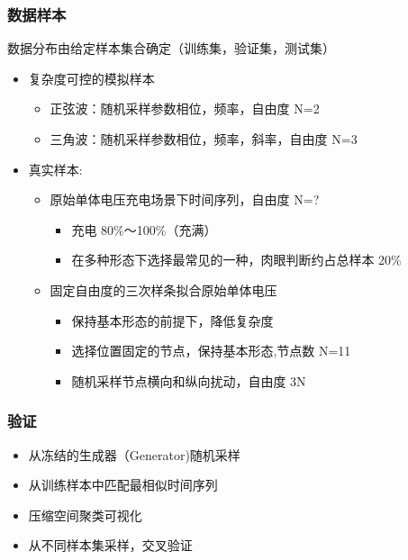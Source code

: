 \documentclass[a4paper, 11pt]{article}
\begin{document}
\subsubsection*{数据样本}
\label{sec:org7ee37eb}
数据分布由给定样本集合确定（训练集，验证集，测试集）
\begin{itemize}
\item 复杂度可控的模拟样本
\begin{itemize}
\item 正弦波：随机采样参数相位，频率，自由度 N=2
\item 三角波：随机采样参数相位，频率，斜率，自由度 N=3
\end{itemize}
\item 真实样本:
\begin{itemize}
\item 原始单体电压充电场景下时间序列，自由度 N=?
\begin{itemize}
\item 充电 80\%～100\%（充满）
\item 在多种形态下选择最常见的一种，肉眼判断约占总样本 20\%
\end{itemize}
\item 固定自由度的三次样条拟合原始单体电压
\begin{itemize}
\item 保持基本形态的前提下，降低复杂度
\item 选择位置固定的节点，保持基本形态,节点数 N=11
\item 随机采样节点横向和纵向扰动，自由度 3N
\end{itemize}
\end{itemize}
\end{itemize}
\subsubsection*{验证}
\label{sec:org0522e7e}
\begin{itemize}
\item 从冻结的生成器（Generator)随机采样
\item 从训练样本中匹配最相似时间序列
\item 压缩空间聚类可视化
\item 从不同样本集采样，交叉验证
\end{itemize}
\end{document}
